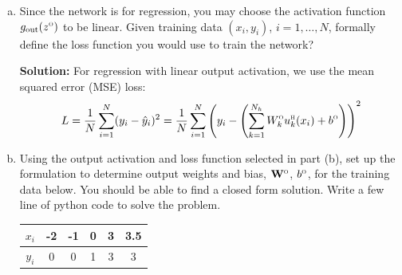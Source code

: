 \documentclass[11pt]{article}
\newcommand{\Wbf}{\mathbf{W}}
\def\hid{\textsc{\tiny H}}
\def\out{\textsc{\tiny O}}
\begin{document}
\begin{enumerate}
\begin{enumerate}[(a)]
\textbf{Solution:}
$N_h = 3$ (from the dimension of $\Wbf^\hid$).

For each $j$:
\begin{align*}
u_1^\hid(x) &= \max\{0, -x - 1\} = \begin{cases} -x - 1 & \text{if } x \leq -1 \\ 0 & \text{if } x > -1 \end{cases} \\
u_2^\hid(x) &= \max\{0, x + 1\} = \begin{cases} 0 & \text{if } x < -1 \\ x + 1 & \text{if } x \geq -1 \end{cases} \\
u_3^\hid(x) &= \max\{0, x - 2\} = \begin{cases} 0 & \text{if } x < 2 \\ x - 2 & \text{if } x \geq 2 \end{cases}
\end{align*}
These are ReLU functions with breakpoints at $x = -1$, $x = -1$, and $x = 2$ respectively.

\item Since the network is for regression, you may choose
the activation function $g_{\rm out}(z^\out)$ to be linear.
Given training data $(x_i,y_i)$, $i=1,\ldots,N$, formally define the loss function you would use
to train the network?

\textbf{Solution:}
For regression with linear output activation, we use the mean squared error (MSE) loss:
\[
L = \frac{1}{N} \sum_{i=1}^N (y_i - \hat{y}_i)^2 = \frac{1}{N} \sum_{i=1}^N \left(y_i - \left(\sum_{k=1}^{N_h} W_k^\out u_k^\hid(x_i) + b^\out\right)\right)^2
\]

\item Using the output activation and loss function selected in part (b), set up the formulation to determine
output weights and bias, $\Wbf^\out$, $b^\out$,
for the training data below.  You should be able to find a closed form solution. Write a few line of python code to solve the problem.
\begin{center}
\begin{tabular}{|c|c|c|c|c|c|} \hline
$x_i$ & -2 & -1 & 0 & 3 & 3.5\\ \hline
$y_i$ & 0 & 0   & 1 & 3 & 3 \\ \hline
\end{tabular}
\end{center}


\end{enumerate}
\end{enumerate}
\end{document}
